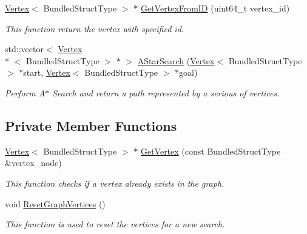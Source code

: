 \begin{DoxyCompactItemize}
\hyperlink{classsrcl__ctrl_1_1Vertex}{Vertex}$<$ Bundled\-Struct\-Type $>$ $\ast$ \hyperlink{classsrcl__ctrl_1_1Graph_a9fa6ba62e45c9a67109f9fe2f27eda86}{Get\-Vertex\-From\-I\-D} (uint64\-\_\-t vertex\-\_\-id)
\begin{DoxyCompactList}\small\item\em This function return the vertex with specified id. \end{DoxyCompactList}\item 
std\-::vector$<$ \hyperlink{classsrcl__ctrl_1_1Vertex}{Vertex}\\*
$<$ Bundled\-Struct\-Type $>$ $\ast$ $>$ \hyperlink{classsrcl__ctrl_1_1Graph_a8ffd8ddc00dc90d53713090d90e7974a}{A\-Star\-Search} (\hyperlink{classsrcl__ctrl_1_1Vertex}{Vertex}$<$ Bundled\-Struct\-Type $>$ $\ast$start, \hyperlink{classsrcl__ctrl_1_1Vertex}{Vertex}$<$ Bundled\-Struct\-Type $>$ $\ast$goal)
\begin{DoxyCompactList}\small\item\em Perform A$\ast$ Search and return a path represented by a serious of vertices. \end{DoxyCompactList}\end{DoxyCompactItemize}
\subsection*{Private Member Functions}
\begin{DoxyCompactItemize}
\item 
\hyperlink{classsrcl__ctrl_1_1Vertex}{Vertex}$<$ Bundled\-Struct\-Type $>$ $\ast$ \hyperlink{classsrcl__ctrl_1_1Graph_ad7d00e1136a82de0d2d76e16f4b467a2}{Get\-Vertex} (const Bundled\-Struct\-Type \&vertex\-\_\-node)
\begin{DoxyCompactList}\small\item\em This function checks if a vertex already exists in the graph. \end{DoxyCompactList}\item 
void \hyperlink{classsrcl__ctrl_1_1Graph_ad616e7b44b7c5a53f3d669b91a083d3e}{Reset\-Graph\-Vertices} ()
\begin{DoxyCompactList}\small\item\em This function is used to reset the vertices for a new search. \end{DoxyCompactList}\end{DoxyCompactItemize}
